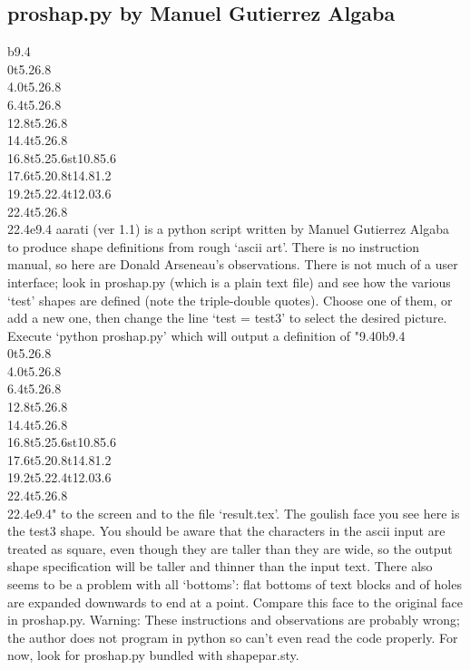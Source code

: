 \documentclass[draft]{article}
\makeatletter
\DeclareRobustCommand{\_}{%
  \ifmmode \nfss@text{\textunderscore}\else \BreakableUnderscore \fi}
\makeatother
\begin{document}
\subsection{proshap.py by Man\-uel Gu\-ti\-er\-rez Al\-ga\-ba}
\begin{minipage}{0.2\textwidth}
\gdef\bassshape{{9.4}{0}b{9.4}
\\{0}t{5.2}{6.8}
\\{4.0}t{5.2}{6.8}
\\{6.4}t{5.2}{6.8}
\\{12.8}t{5.2}{6.8}
\\{14.4}t{5.2}{6.8}
\\{16.8}t{5.2}{5.6}st{10.8}{5.6}
\\{17.6}t{5.2}{0.8}t{14.8}{1.2}
\\{19.2}t{5.2}{2.4}t{12.0}{3.6}
\\{22.4}t{5.2}{6.8}
\\{22.4}e{9.4}}

\shapepar\bassshape
aarati (ver 1.1) is a python script written by Man\-uel
Gu\-ti\-er\-rez Al\-ga\-ba to produce shape definitions from rough
`ascii art'.  There is no instruction manual, so here are Donald
Arseneau's observations. There is not much of a user interface; look
in proshap.py (which is a plain text file) and see how the various
`test' shapes are defined (note the triple-double quotes).  Choose
one of them, or add a new one, then change the line `test = test3' to select
the desired picture.  Execute `python proshap.py' which will output a
definition of "\bassshape" to the screen and to the file `result.tex'.
The goul\-ish face you see here is the test3 shape.  You should be
aware that the characters in the ascii input are treated as square,
even though they are taller than they are wide, so the output shape
specification will be taller and thinner than the input text.  There
also seems to be a problem with all `bottoms': flat bottoms of text
blocks and of holes are expanded downwards to end at a point.  Compare
this face to the original face in proshap.py.  Warning: These
instructions and observations are probably wrong; the author does not
program in python so can't even read the code properly.  For now, look
for proshap.py bundled with shapepar.sty.
\end{minipage}
\end{document}
